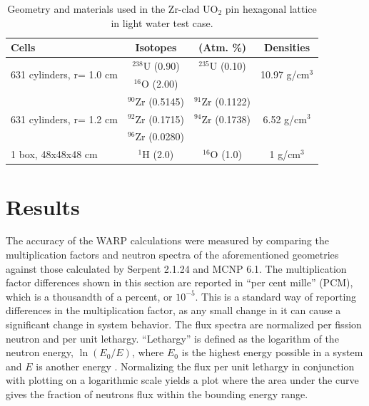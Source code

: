 \documentclass[preprint,12pt]{elsarticle}
\begin{document}
\begin{table}[h]
\centering
\caption{Geometry and materials used in the Zr-clad UO$_2$ pin hexagonal lattice in light water test case.}
\label{hex_geom}
\begin{tabular}{| l | c  c | c |}
\hline
Cells & Isotopes & (Atm. \%) & Densities \\
\hline
\multirow{2}{*}{631 cylinders, r= 1.0 cm }  &   $^{238}$U   (0.90)   &    $^{235}$U   (0.10)  &  \multirow{2}{*}{10.97 g/cm$^3$} \\
                                           &   $^{16}$O    (2.00)   &                        &  \\
\hline
\multirow{3}{*}{631 cylinders, r= 1.2 cm }  &   $^{90}$Zr   (0.5145) &    $^{91}$Zr   (0.1122)&  \multirow{3}{*}{6.52 g/cm$^3$} \\
                                           &   $^{92}$Zr   (0.1715) &    $^{94}$Zr   (0.1738)& \\
                                           &   $^{96}$Zr   (0.0280) &                        & \\
\hline
\multirow{1}{*}{1 box, 48x48x48 cm }         &   $^{1}$H     (2.0)    &   $^{16}$O  (1.0) & \multirow{1}{*}{1 g/cm$^3$} \\
\hline
\end{tabular}
\end{table}




\section{Results}
\label{sec:results}
 

The accuracy of the WARP calculations were measured by comparing the multiplication factors and neutron spectra of the aforementioned geometries against those calculated by Serpent 2.1.24 and MCNP 6.1.  The multiplication factor differences shown in this section are reported in ``per cent mille'' (PCM), which is a thousandth of a percent, or $10^{-5}$.  This is a standard way of reporting differences in the multiplication factor, as any small change in it can cause a significant change in system behavior.  The flux spectra are normalized per fission neutron and per unit lethargy.   ``Lethargy'' is defined as the logarithm of the neutron energy, $\ln(E_0/E)$, where $E_0$ is the highest energy possible in a system and $E$ is another energy \cite{duderstadt}.  Normalizing the flux per unit lethargy in conjunction with plotting on a logarithmic scale yields a plot where the area under the curve gives the fraction of neutrons flux within the bounding energy range. 
\end{document}
